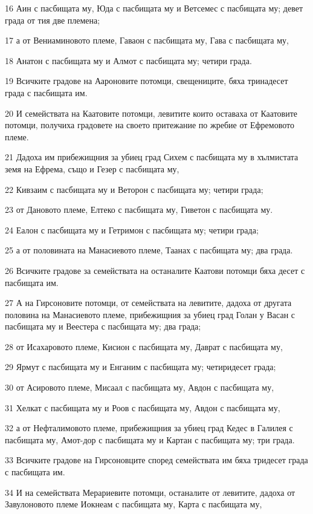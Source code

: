 \par 16 Аин с пасбищата му, Юда с пасбищата му и Ветсемес с пасбищата му; девет града от тия две племена;
\par 17 а от Вениаминовото племе, Гаваон с пасбищата му, Гава с пасбищата му,
\par 18 Анатон с пасбищата му и Алмот с пасбищата му; четири града.
\par 19 Всичките градове на Аароновите потомци, свещениците, бяха тринадесет града с пасбищата им.
\par 20 И семействата на Каатовите потомци, левитите които оставаха от Каатовите потомци, получиха градовете на своето притежание по жребие от Ефремовото племе.
\par 21 Дадоха им прибежищния за убиец град Сихем с пасбищата му в хълмистата земя на Ефрема, също и Гезер с пасбищата му,
\par 22 Кивзаим с пасбищата му и Веторон с пасбищата му; четири града;
\par 23 от Дановото племе, Елтеко с пасбищата му, Гиветон с пасбищата му.
\par 24 Еалон с пасбищата му и Гетримон с пасбищата му; четири града;
\par 25 а от половината на Манасиевото племе, Таанах с пасбищата му; два града.
\par 26 Всичките градове за семействата на останалите Каатови потомци бяха десет с пасбищата им.
\par 27 А на Гирсоновите потомци, от семействата на левитите, дадоха от другата половина на Манасиевото племе, прибежищния за убиец град Голан у Васан с пасбищата му и Веестера с пасбищата му; два града;
\par 28 от Исахаровото племе, Кисион с пасбищата му, Даврат с пасбищата му,
\par 29 Ярмут с пасбищата му и Енганим с пасбищата му; четиридесет града;
\par 30 от Асировото племе, Мисаал с пасбищата му, Авдон с пасбищата му,
\par 31 Хелкат с пасбищата му и Роов с пасбищата му, Авдон с пасбищата му,
\par 32 а от Нефталимовото племе, прибежищния за убиец град Кедес в Галилея с пасбищата му, Амот-дор с пасбищата му и Картан с пасбищата му; три града.
\par 33 Всичките градове на Гирсоновците според семействата им бяха тридесет града с пасбищата им.
\par 34 И на семействата Мерариевите потомци, останалите от левитите, дадоха от Завулоновото племе Иокнеам с пасбищата му, Карта с пасбищата му,
